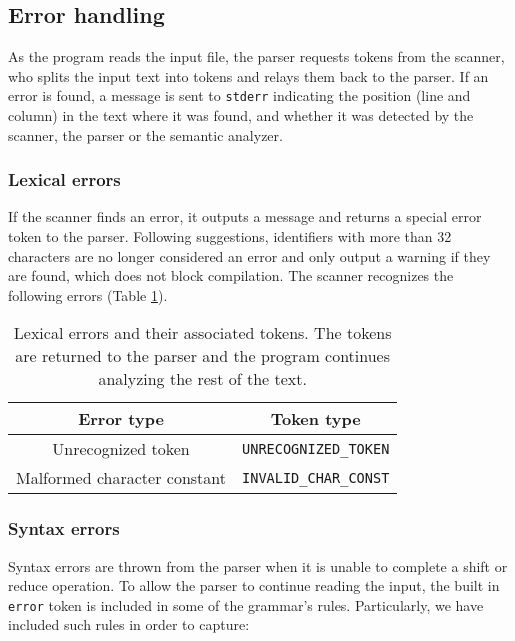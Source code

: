 \subsection{Error handling}
As the program reads the input file, the parser requests tokens from the scanner, who splits the
input text into tokens and relays them back to the parser. If an error is found, a message is
sent to \texttt{stderr} indicating the position (line and column) in the text where it was found,
and whether it was detected by the scanner, the parser or the semantic analyzer.


\subsubsection{Lexical errors}
If the scanner finds an error, it outputs a message and returns a special error token to the parser.
Following suggestions, identifiers with more than 32 characters are no longer considered an error
and only output a warning if they are found, which does not block compilation.
The scanner recognizes the following errors (Table \ref{tab:scanner-errors}).

\begin{table}[h]
\centering
\captionsetup{width=0.7\textwidth}
\caption{Lexical errors and their associated tokens. The tokens are returned
to the parser and the program continues analyzing the rest of the text.}
\label{tab:scanner-errors}
\begin{tabular} {c c}
\hline
Error type & Token type \\
\hline
Unrecognized token & \texttt{UNRECOGNIZED\_TOKEN} \\
Malformed character constant & \texttt{INVALID\_CHAR\_CONST} \\
\hline
\end{tabular}
\end{table}

\subsubsection{Syntax errors}
Syntax errors are thrown from the parser when it is unable to complete a shift or reduce
operation. To allow the parser to continue reading the input, the built in \texttt{error}
token is included in some of the grammar's rules. Particularly, we have included
such rules in order to capture: 

